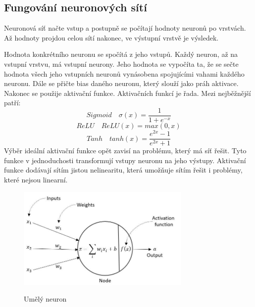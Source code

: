 \subsection{Fungování neuronových sítí}
Neuronová síť načte vstup a postupně se počítají hodnoty neuronů po vrstvách.
Až hodnoty projdou celou sítí nakonec, ve výstupní vrstvě je výsledek.

Hodnota konkrétního neuronu se spočítá z jeho vstupů. Každý neuron, až na vstupní vrstvu, má vstupní neurony.
Jeho hodnota se vypočíta ta, že se sečte hodnota všech jeho vstupních neuronů vynásobena spojujícími vahami každého neuronu.
Dále se přičte bias daného neuronu, který slouží jako práh aktivace. Nakonec se použije aktivační funkce.
Aktivačních funkcí je řada.
Mezi nejběžnější patří:
\[Sigmoid\quad \sigma(x) = \frac{1}{1 + e^{-x}}\]
\[ReLU\quad ReLU(x) = max(0, x)\]
\[Tanh\quad tanh(x) = \frac{e^{2x} - 1}{e^{2x} + 1}\]
Výběr ideální aktivační funkce opět zavisí na problému, který má síť řešit.
Tyto funkce v jednoduchosti transformují vstupy neuronu na jeho výstupy.
Aktivační funkce dodávají sítím jistou nelinearitu, která umožňuje sítím řešit i problémy, které nejsou linearní.

\begin{figure}[h]
    \centering
    \includegraphics[width=0.75\textwidth]{images/neuron.jpg}
    \caption{Umělý neuron}\cite{umely_neuron}
\end{figure}

\newpage
